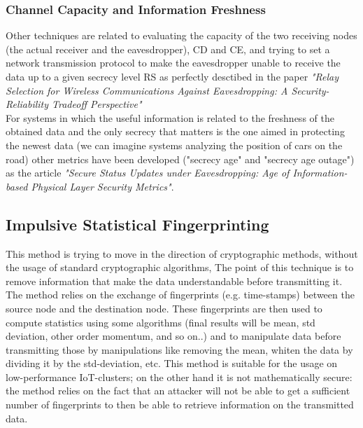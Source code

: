 \subsubsection{Channel Capacity and Information Freshness}
Other techniques are related to evaluating the capacity of the two receiving nodes (the actual receiver and the eavesdropper), CD and CE, and trying to set a network transmission protocol to make the eavesdropper unable to receive the data up to a given secrecy level RS as perfectly desctibed in the paper \textit{"Relay Selection for Wireless Communications Against Eavesdropping: A Security-Reliability Tradeoff Perspective"} \cite{Zou_2016}\\
For systems in which the useful information is related to the freshness of the obtained data and the only secrecy that matters is the one aimed in protecting the newest data (we can imagine systems analyzing the position of cars on the road) other metrics have been developed ("secrecy age" and "secrecy age outage") as the article \textit{"Secure Status Updates under Eavesdropping: Age of Information-based Physical Layer Security Metrics"}\cite{https://doi.org/10.48550/arxiv.2002.07340}.

\subsection{Impulsive Statistical Fingerprinting}
This method is trying to move in the direction of cryptographic methods, without the usage of standard cryptographic algorithms, The point of this technique is to remove information that make the data understandable before transmitting it. The method relies on the exchange of fingerprints (e.g. time-stamps) between the source node and the destination node. These fingerprints are then used to compute statistics using some algorithms (final results will be mean, std deviation, other order momentum, and so on..) and to manipulate data before transmitting those by manipulations like removing the mean, whiten the data by dividing it by the std-deviation, etc. This method is suitable for the usage on low-performance IoT-clusters; on the other hand it is not mathematically secure: the method relies on the fact that an attacker will not be able to get a sufficient number of fingerprints to then be able to retrieve information on the transmitted data.

